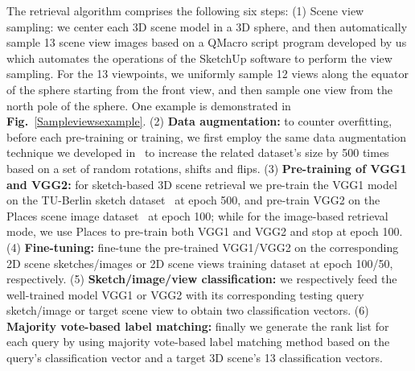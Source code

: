 \documentclass[times, 10pt,twocolumn]{article}
\begin{document}
The retrieval algorithm comprises the following six steps: (1) {Scene view sampling:} we center each 3D scene model in a 3D sphere, and then automatically sample 13 scene view images based on a QMacro script program developed by us which automates the operations of the SketchUp software to perform the view sampling. For the 13 viewpoints, we uniformly sample 12 views along the equator of the sphere starting from the front view, and then sample one view from the north pole of the sphere. One example is demonstrated in \textbf{Fig.}~\ref{Sampleviewsexample}. 
(2) \textbf{Data augmentation:} to counter overfitting, before each pre-training or training, we first employ the same data augmentation technique we developed in~\cite{DBLP:conf/icpr/Ye0L16} to increase the related dataset's size by 500 times based on a set of random rotations, shifts and flips. 
(3)  \textbf{Pre-training of VGG1 and VGG2:} for sketch-based 3D scene retrieval we pre-train the VGG1 model on the TU-Berlin sketch dataset~\cite{DBLP:journals/tog/EitzHA12} at epoch 500, and pre-train VGG2 on the Places scene image dataset~\cite{DBLP:journals/pami/ZhouLKO018} at epoch 100; while for the image-based retrieval mode, we use Places to pre-train both VGG1 and VGG2 and stop at epoch 100. 
(4) \textbf{Fine-tuning:} fine-tune the pre-trained VGG1/VGG2 on the corresponding 2D scene sketches/images or 2D scene views training dataset at epoch 100/50, respectively. 
(5) \textbf{Sketch/image/view classification:} we respectively feed the well-trained model VGG1 or VGG2 with its corresponding testing query sketch/image or target scene view to obtain two classification vectors. 
(6) \textbf{Majority vote-based label matching:} finally we generate the rank list for each query by using majority vote-based label matching method based on the query's classification vector and a target 3D scene's 13 classification vectors.     


\end{document}
